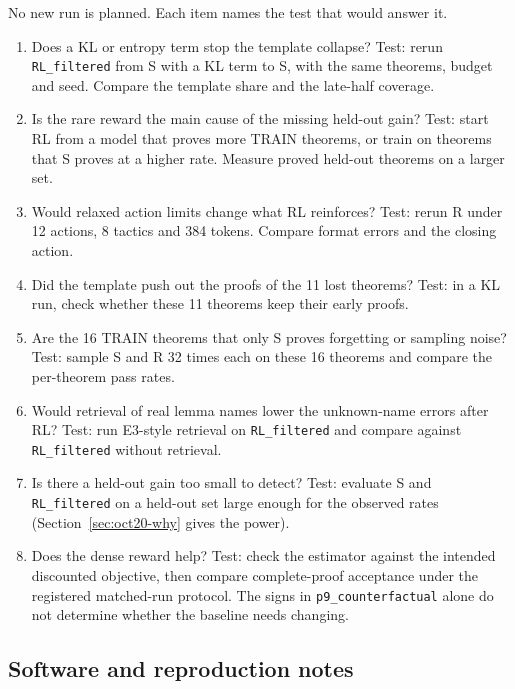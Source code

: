 \documentclass[11pt]{article}
\newcommand{\code}[1]{\texttt{#1}}
\newcommand{\pth}[1]{\nolinkurl{#1}}
\begin{document}
No new run is planned. Each item names the test that would answer it.
\begin{enumerate}
\item Does a KL or entropy term stop the template collapse? Test: rerun \code{RL\_filtered} from S with a KL term to S, with the same theorems, budget and seed. Compare the template share and the late-half coverage.
\item Is the rare reward the main cause of the missing held-out gain? Test: start RL from a model that proves more TRAIN theorems, or train on theorems that S proves at a higher rate. Measure proved held-out theorems on a larger set.
\item Would relaxed action limits change what RL reinforces? Test: rerun R under 12 actions, 8 tactics and 384 tokens. Compare format errors and the closing action.
\item Did the template push out the proofs of the 11 lost theorems? Test: in a KL run, check whether these 11 theorems keep their early proofs.
\item Are the 16 TRAIN theorems that only S proves forgetting or sampling noise? Test: sample S and R 32 times each on these 16 theorems and compare the per-theorem pass rates.
\item Would retrieval of real lemma names lower the unknown-name errors after RL? Test: run E3-style retrieval on \code{RL\_filtered} and compare against \code{RL\_filtered} without retrieval.
\item Is there a held-out gain too small to detect? Test: evaluate S and \code{RL\_filtered} on a held-out set large enough for the observed rates (Section~\ref{sec:oct20-why} gives the power).
\item Does the dense reward help? Test: check the estimator against the intended discounted objective, then compare complete-proof acceptance under the registered matched-run protocol. The signs in \pth{p9_counterfactual} alone do not determine whether the baseline needs changing.
\end{enumerate}

\subsection{Software and reproduction notes}
\label{sec:software-notes}
\end{document}
